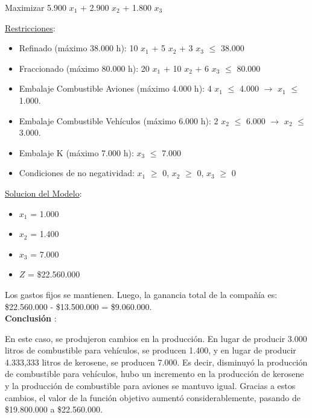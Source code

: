 \documentclass[10pt,a4paper]{article}
\begin{document}
\begin{enumerate}[label=\textbf{\sffamily\large\arabic*.}]
\begin{center}
        Maximizar 5.900 $x_{1}$ + 2.900 $x_{2}$ + 1.800 $x_{3}$

    \end{center}

    \underline{Restricciones}: 

    \begin{itemize}

        \item Refinado (máximo 38.000 h): 10 $x_{1}$ + 5 $x_{2}$ + 3 $x_{3}$ $\leq$ 38.000
        \item Fraccionado (máximo 80.000 h): 20 $x_{1}$ + 10 $x_{2}$ + 6 $x_{3}$ $\leq$ 80.000
        \item Embalaje Combustible Aviones (máximo 4.000 h): 4 $x_{1}$ $\leq$ 4.000 $\rightarrow$ $x_{1}$ $\leq$ 1.000.
        \item Embalaje Combustible Vehículos (máximo 6.000 h): 2 $x_{2}$ $\leq$ 6.000 $\rightarrow$ $x_{2}$ $\leq$ 3.000.
        \item Embalaje K (máximo 7.000 h): $x_{3}$ $\leq$ 7.000
        \item Condiciones de no negatividad: $x_{1}$ $\geq$ 0, $x_{2}$ $\geq$ 0, $x_{3}$ $\geq$ 0\\

    \end{itemize}

    \underline{Solucion del Modelo}: 

    \begin{itemize}

        \item $x_{1}$ = 1.000
        \item $x_{2}$ = 1.400
        \item $x_{3}$ = 7.000
        \item $Z$ = \$22.560.000\\

    \end{itemize}
    

    Los gastos fijos se mantienen. Luego, la ganancia total de la compañía es: \$22.560.000 - \$13.500.000 = \$9.060.000. \\

    \textbf{Conclusión }:
    
    En este caso, se produjeron cambios en la producción. En lugar de producir 3.000 litros de combustible para vehículos, se producen 1.400, y en lugar de producir 4.333,333 litros de kerosene, se producen 7.000. \newline
    Es decir, disminuyó la producción de combustible para vehículos, hubo un incremento en la producción de kerosene y la producción de combustible para aviones se mantuvo igual. Gracias a estos cambios, el valor de la función objetivo aumentó considerablemente, pasando de \$19.800.000 a \$22.560.000. \\


\end{enumerate}
\end{document}
